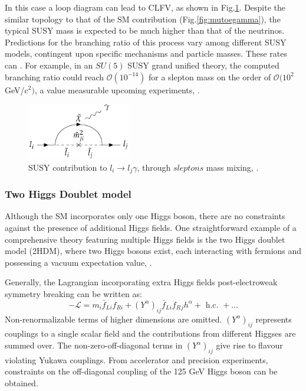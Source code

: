 In this case a loop diagram can lead to CLFV, as shown in Fig.\ref{fig:susy}. 
Despite the similar topology to that of the SM contribution (Fig.\ref{fig:mutoegamma}), 
the typical SUSY mass is expected to be much higher than that of the neutrinos. 
Predictions for the branching ratio of this process vary among different SUSY models, 
contingent upon specific mechanisms and particle masses. These rates can .
For example, in an $SU(5)$ SUSY grand unified theory, the 
computed branching ratio could reach $\mathcal{O}(10^{-14})$ for a 
slepton mass on the order of $\mathcal{O}(10^{2}$ GeV/c$^2)$, 
a value measurable  upcoming experiments, \cite{clfv_signorelli}.

\begin{figure}[!h]
\centering
\includegraphics[width =0.4\textwidth]{figures/png/Screenshot_20240218_105920.png}
\caption[SUSY contribution to $l_i \rightarrow l_j\gamma$.]{SUSY contribution to $l_i \rightarrow l_j\gamma$, through $sleptons$ mass mixing, \cite{universe8060299}.}
\label{fig:susy}
\end{figure}


\subsubsection{Two Higgs Doublet model}\label{2higgs}
Although the SM incorporates only one Higgs boson, there are 
no constraints against the presence of additional Higgs fields. 
One straightforward example of a comprehensive theory featuring 
multiple Higgs fields is the two Higgs doublet model 
(2HDM), where two Higgs bosons exist, each interacting with 
fermions and possessing a vacuum expectation value, \cite{Harnik_2013}.

Generally, the Lagrangian incorporating extra Higgs fields post-electroweak symmetry breaking can be written as:
\begin{equation}
-\mathscr{L}=m_i \bar{f}_{L i} f_{R i}+\left(Y^\alpha\right)_{i j} \bar{f}_{L i} f_R{ }_j h^\alpha+\text { h.c. }+\ldots
\end{equation}
Non-renormalizable terms of higher dimensions are omitted. $(Y^\alpha)_{i j}$ represents couplings to a single scalar field and the contributions from different Higgses are summed over. The non-zero-off-diagonal terms in $(Y^\alpha)_{i j}$ give rise to flavour violating Yukawa couplings. From accelerator and precision experiments, constraints on the off-diagonal coupling of the 125 GeV Higgs boson can be obtained.
